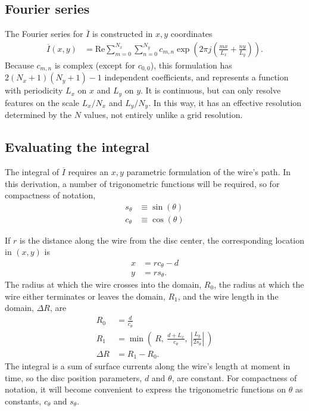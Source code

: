 \documentclass{article}
\def\I{\overline{I}}
\def\real{\mathrm{Re}}
\begin{document}
\subsection{Fourier series}

The Fourier series for $\I$ is constructed in $x,y$ coordinates
\begin{align}
\I(x,y) &= \real \sum_{m=0}^{N_x} \sum_{n=0}^{N_y} c_{m,n} \exp\left(2\pi j \left(\frac{mx}{L_x} + \frac{ny}{L_y}\right)\right).
\end{align}
Because $c_{m,n}$ is complex (except for $c_{0,0}$), this formulation has $2(N_x+1)(N_y+1)-1$ independent coefficients, and represents a function with periodicity $L_x$ on $x$ and $L_y$ on $y$.  It is continuous, but can only resolve features on the scale $L_x / N_x$ and $L_y / N_y$.  In this way, it has an effective resolution determined by the $N$ values, not entirely unlike a grid resolution.

\subsection{Evaluating the integral}

The integral of $\I$ requires an $x,y$ parametric formulation of the wire's path.  In this derivation, a number of trigonometric functions will be required, so for compactness of notation, 
\begin{align}
s_\theta &\equiv \sin(\theta)\\
c_\theta &\equiv \cos(\theta)
\end{align}

If $r$ is the distance along the wire from the disc center, the corresponding location in $(x,y)$ is
\begin{align}
x &= r c_\theta - d\\
y &= r s_\theta.
\end{align}
The radius at which the wire crosses into the domain, $R_0$, the radius at which the wire either terminates or leaves the domain, $R_1$, and the wire length in the domain, $\Delta R$, are
\begin{align}
R_0 &= \frac{d}{c_\theta}\\
R_1 &= \min\left(\ R,\ \frac{d + L_x}{c_\theta},\ \left|\frac{L_y}{2s_\theta}\right|\ \right)\\
\Delta R &= R_1 - R_0.
\end{align}
The integral is a sum of surface currents along the wire's length at moment in time, so the disc position parameters, $d$ and $\theta$, are constant.  For compactness of notation, it will become convenient to express the trigonometric functions on $\theta$ as constants, $c_\theta$ and $s_\theta$.
\end{document}
